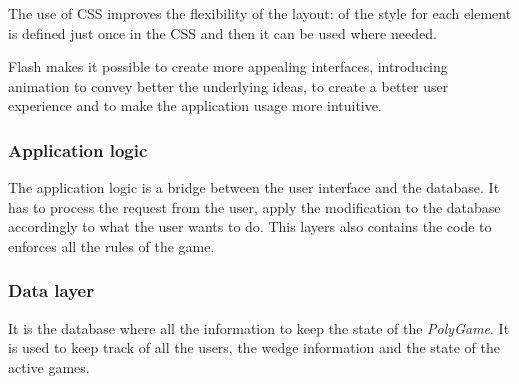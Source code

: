 The use of CSS improves the flexibility of the layout: of the style for each element is defined just once in the CSS and then it can be used where needed.

Flash makes it possible to create more appealing interfaces, introducing animation to convey better the underlying ideas, to create a better user experience and to make the application usage more intuitive.

\subsubsection{Application logic}
The application logic is a bridge between the user interface and the database. It has to process the request from the user, apply the modification to the database accordingly to what the user wants to do. This layers also contains the code to enforces all the rules of the game.

\subsubsection{Data layer}
It is the database where all the information to keep the state of the \emph{PolyGame}. It is used to keep track of all the users, the wedge information and the state of the active games.